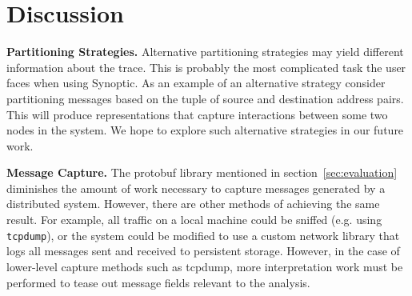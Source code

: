 \section{Discussion}
\label{sec:discussion}



\textbf{Partitioning Strategies.} Alternative partitioning strategies
may yield different information about the trace. This is probably the
most complicated task the user faces when using Synoptic. As an
example of an alternative strategy consider partitioning messages
based on the tuple of source and destination address pairs. This will
produce representations that capture interactions between some two
nodes in the system. We hope to explore such alternative strategies in
our future work.


\textbf{Message Capture.} The protobuf library mentioned in
section~\ref{sec:evaluation} diminishes the amount of work necessary
to capture messages generated by a distributed system. However, there
are other methods of achieving the same result. For example, all
traffic on a local machine could be sniffed (e.g. using
\texttt{tcpdump}), or the system could be modified to use a custom
network library that logs all messages sent and received to persistent
storage. However, in the case of lower-level capture methods such as
tcpdump, more interpretation work must be performed to tease out
message fields relevant to the analysis.


